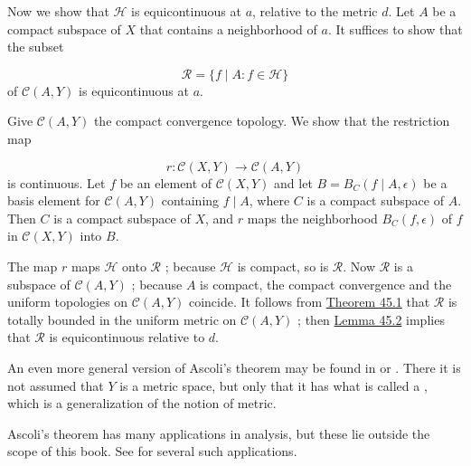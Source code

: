 Now we show that \(\mathcal{H}\) is equicontinuous at \(a\), relative to the metric \(d\). Let \(A\) be a compact subspace of \(X\) that contains a neighborhood of \(a\). It suffices to show that the subset

\[
\mathcal{R} = \{ f \mid A : f \in \mathcal{H}\}
\]
of \(\mathcal{C}({A,Y})\) is equicontinuous at \(a\).

Give \(\mathcal{C}({A,Y})\) the compact convergence topology. We show that the restriction map

\[
r : \mathcal{C}({X,Y}) \rightarrow \mathcal{C}({A,Y})
\]
is continuous. Let \(f\) be an element of \(\mathcal{C}({X,Y})\) and let \(B = B_{C}({f \mid A,\epsilon })\) be a basis element for \(\mathcal{C}({A,Y})\) containing \(f \mid A\), where \(C\) is a compact subspace of \(A\). Then \(C\) is a compact subspace of \(X\), and \(r\) maps the neighborhood \(B_{C}({f,\epsilon })\) of \(f\) in \(\mathcal{C}({X,Y})\) into \(B\).

The map \(r\) maps \(\mathcal{H}\) onto \(\mathcal{R}\) ; because \(\mathcal{H}\) is compact, so is \(\mathcal{R}\). Now \(\mathcal{R}\) is a subspace of \(\mathcal{C}({A,Y})\) ; because \(A\) is compact, the compact convergence and the uniform topologies on \(\mathcal{C}({A,Y})\) coincide. It follows from \hyperref[thm:45.1]{Theorem 45.1} that \(\mathcal{R}\) is totally bounded in the uniform metric on \(\mathcal{C}({A,Y})\) ; then \hyperref[lem:45.2]{Lemma 45.2} implies that \(\mathcal{R}\) is equicontinuous relative to \(d\).

An even more general version of Ascoli's theorem may be found in \cite{Kelley1991} or \cite{Willard1970}. There it is not assumed that \(Y\) is a metric space, but only that it has what is called a , which is a generalization of the notion of metric.

Ascoli's theorem has many applications in analysis, but these lie outside the scope of this book. See \cite{KolmogorovFomin1957} for several such applications.

